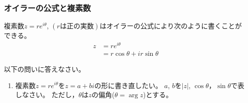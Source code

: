 \documentclass[twocolumn,11pt]{jarticle}
\begin{document}
\subsubsection{オイラーの公式と複素数\label{sec:Euler-complex}}

複素数$z=re^{i\theta}$, $(rは正の実数)$はオイラーの公式により次のように書くことができる。
\begin{align*}
  z&=re^{i\theta}\\
  &=r\cos\theta+ir\sin\theta
\end{align*}

\nquestion 以下の問いに答えなさい。
\begin{enumerate}
\item 複素数$z=re^{i\theta}$を$z=a+bi$の形に書き直したい。
$a$, $b$を$|z|$, $\cos\theta$，$\sin\theta$で表しなさい。
ただし，$\theta$は$z$の偏角($\theta=\arg z$)とする。


\end{enumerate}
\end{document}
